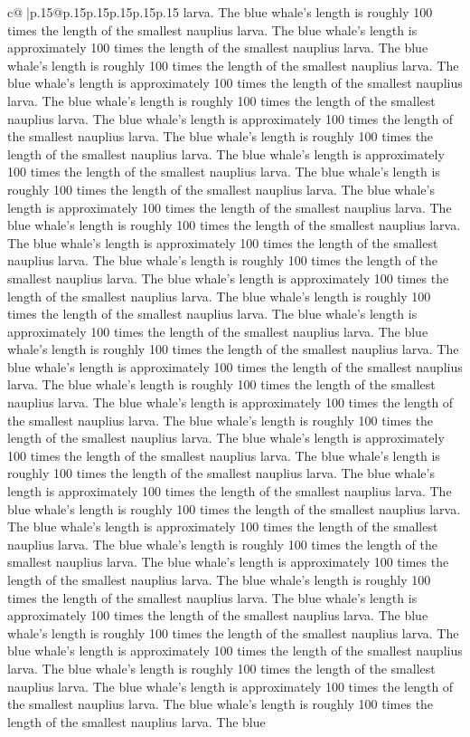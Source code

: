 \documentclass{article}
\begin{document}
{\begin{supertabular}{c@{$\;$}|p{.15\linewidth}@{}p{.15\linewidth}p{.15\linewidth}p{.15\linewidth}p{.15\linewidth}p{.15\linewidth}}
{{{larva. The blue whale's length is roughly 100 times the length of the smallest nauplius larva. The blue whale's length is approximately 100 times the length of the smallest nauplius larva. The blue whale's length is roughly 100 times the length of the smallest nauplius larva. The blue whale's length is approximately 100 times the length of the smallest nauplius larva. The blue whale's length is roughly 100 times the length of the smallest nauplius larva. The blue whale's length is approximately 100 times the length of the smallest nauplius larva. The blue whale's length is roughly 100 times the length of the smallest nauplius larva. The blue whale's length is approximately 100 times the length of the smallest nauplius larva. The blue whale's length is roughly 100 times the length of the smallest nauplius larva. The blue whale's length is approximately 100 times the length of the smallest nauplius larva. The blue whale's length is roughly 100 times the length of the smallest nauplius larva. The blue whale's length is approximately 100 times the length of the smallest nauplius larva. The blue whale's length is roughly 100 times the length of the smallest nauplius larva. The blue whale's length is approximately 100 times the length of the smallest nauplius larva. The blue whale's length is roughly 100 times the length of the smallest nauplius larva. The blue whale's length is approximately 100 times the length of the smallest nauplius larva. The blue whale's length is roughly 100 times the length of the smallest nauplius larva. The blue whale's length is approximately 100 times the length of the smallest nauplius larva. The blue whale's length is roughly 100 times the length of the smallest nauplius larva. The blue whale's length is approximately 100 times the length of the smallest nauplius larva. The blue whale's length is roughly 100 times the length of the smallest nauplius larva. The blue whale's length is approximately 100 times the length of the smallest nauplius larva. The blue whale's length is roughly 100 times the length of the smallest nauplius larva. The blue whale's length is approximately 100 times the length of the smallest nauplius larva. The blue whale's length is roughly 100 times the length of the smallest nauplius larva. The blue whale's length is approximately 100 times the length of the smallest nauplius larva. The blue whale's length is roughly 100 times the length of the smallest nauplius larva. The blue whale's length is approximately 100 times the length of the smallest nauplius larva. The blue whale's length is roughly 100 times the length of the smallest nauplius larva. The blue whale's length is approximately 100 times the length of the smallest nauplius larva. The blue whale's length is roughly 100 times the length of the smallest nauplius larva. The blue whale's length is approximately 100 times the length of the smallest nauplius larva. The blue whale's length is roughly 100 times the length of the smallest nauplius larva. The blue whale's length is approximately 100 times the length of the smallest nauplius larva. The blue whale's length is roughly 100 times the length of the smallest nauplius larva. The blue }}}
\end{supertabular}}
\end{document}
